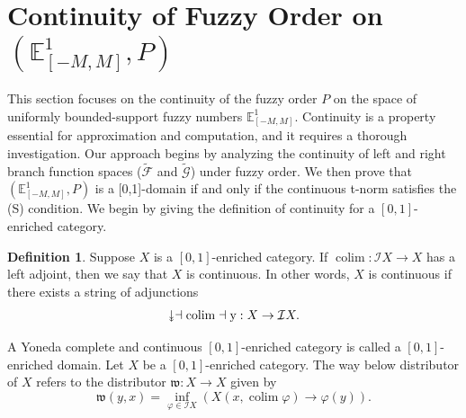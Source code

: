 \documentclass[preprint,3p,times]{elsarticle}
\theoremstyle{plain}
\theoremstyle{definition}
\newtheorem{definition}[thm]{Definition}
\newcommand{\twoheaddownarrow}{\mathrel{\rotatebox[origin=c]{-90}{$\twoheadrightarrow$}}}
\renewcommand{\phi}{\varphi}
\numberwithin{equation}{section}
\begin{document}
\section{Continuity of Fuzzy Order on \((\mathbb{E}^1_{[-M,M]},P)\)}
This section focuses on the continuity of the fuzzy order $P$ on the space of uniformly bounded-support fuzzy numbers $\mathbb{E}^1_{[-M,M]}$. Continuity is a property essential for approximation and computation, and it requires a thorough investigation.  Our approach begins by analyzing the continuity of left and right branch function spaces ($\widetilde{\mathcal{F}}$ and $\widetilde{\mathcal{G}}$) under fuzzy order.  We then prove that \((\mathbb{E}^1_{[-M,M]},P)\) is a [0,1]-domain if and only if the continuous t-norm satisfies the (S) condition. We begin  by giving the definition of continuity for a \([0,1]\)-enriched category.
\begin{definition}
	 Suppose \( X \) is a \([0,1]\)-enriched category. If \( \operatorname{colim}: \mathcal{I}X \to X \) has a left adjoint, then we say that \( X \) is continuous. In other words, \( X \) is continuous if there exists a string of adjunctions
	\[
	 \twoheaddownarrow \dashv \operatorname{colim} \dashv \mathrm{y}: X \to \mathcal{I}X.
	\]
\end{definition}
A Yoneda complete and continuous \([0,1]\)-enriched category is called a \([0,1]\)-enriched domain.
Let \( X \) be a \([0,1]\)-enriched category. The way below distributor of \( X \) refers to the distributor \( \mathfrak{w}: X \to X \) given by
\[
\mathfrak{w}(y, x) = \inf_{\phi \in \mathcal{I}X} \left( X(x, \operatorname{colim} \phi) \to \phi(y) \right).
\]
\end{document}
